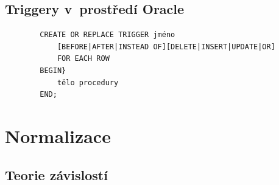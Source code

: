 \documentclass[a4paper,10pt]{article}
\begin{document}
		\subsection{Triggery v~prostředí Oracle}
		\begin{verbatim}
		CREATE OR REPLACE TRIGGER jméno
		    [BEFORE|AFTER|INSTEAD OF][DELETE|INSERT|UPDATE|OR]
		    FOR EACH ROW
		BEGIN}
		    tělo procedury
		END;
		\end{verbatim}

	\section{Normalizace}
		\subsection{Teorie závislostí}
\end{document}
